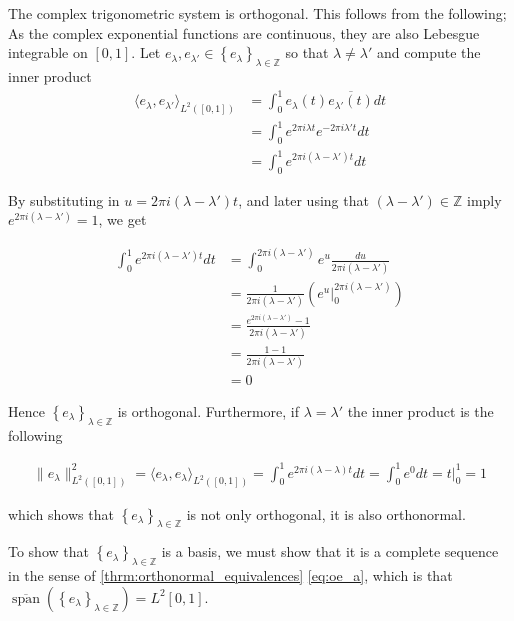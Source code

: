 \documentclass[../thesis.tex]{subfiles}
\begin{document}
The complex trigonometric system is orthogonal. This follows from the following; As the complex exponential functions are continuous, they are also Lebesgue integrable on $[0,1]$. Let $e_{\lambda}, e_{\lambda'} \in \left\{ e_{\lambda} \right\}_{\lambda\in \mathbb{Z}}$ so that $\lambda \neq \lambda'$ and compute the inner product
\begin{align*} 
\langle e_{\lambda},e_{\lambda'} \rangle_{L^2([0,1])} 
&= \int_0^1 e_{\lambda}(t)\overline{e_{\lambda'}(t)} dt\\ &= \int_0^1 e^{2 \pi i {\lambda}t} e^{-2 \pi i {\lambda'}t} dt\\
&= \int_0^1 e^{2 \pi i (\lambda-\lambda')t} dt
\end{align*}

By substituting in $u= 2 \pi i (\lambda-\lambda')t$, and later using that $(\lambda-\lambda') \in \mathbb{Z}$ imply $e^{2 \pi i (\lambda-\lambda')} = 1$,  we get

\begin{align*} 
\int_0^1 e^{2 \pi i (\lambda-\lambda')t} dt 
&= \int_0^{2 \pi i(\lambda-\lambda')} e^{u} \frac{du}{2 \pi i (\lambda-\lambda')}\\ 
&=\frac{1}{2 \pi i (\lambda-\lambda')}\left( e^u  \big| _0^{2 \pi i (\lambda-\lambda')}\right)\\
&=\frac{e^{2 \pi i(\lambda-\lambda')}-1}{2 \pi i (\lambda-\lambda')}\\ &=\frac{1-1}{2 \pi i (\lambda-\lambda')} \\
&= 0
\end{align*}

Hence $\left\{ e_{\lambda} \right\}_{\lambda\in \mathbb{Z}}$ is orthogonal. Furthermore, if  $\lambda =\lambda'$ the inner product is the following

\begin{align}\label{eq:exp_norm_one}
    \| e_\lambda \|^2_{L^2([0,1])} 
    = \langle e_{\lambda},e_{\lambda} \rangle_{L^2([0,1])} 
    = \int_0^1 e^{2 \pi i (\lambda-\lambda)t} dt
    = \int_0^1 e^{0} dt = t  \big| _0^{1}= 1
\end{align}

which shows that $\left\{ e_{\lambda} \right\}_{\lambda\in \mathbb{Z}}$ is not only orthogonal, it is also orthonormal. 


To show that $\left\{ e_{\lambda} \right\}_{\lambda\in \mathbb{Z}}$ is a basis, we must show that it is a complete sequence in the sense of \cref{thrm:orthonormal_equivalences} \cref{eq:oe_a}, which is that $\overline{\operatorname{span}} \left( \left\{ e_{\lambda} \right\}_{\lambda\in \mathbb{Z}} \right) = L^2{[0,1]}$.
\end{document}

